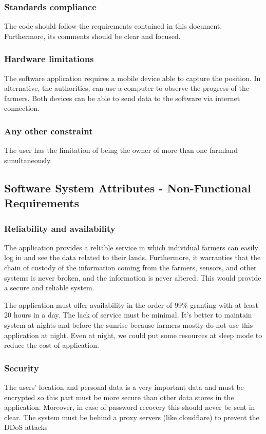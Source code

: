     \subsubsection{Standards compliance}
    The code should follow the requirements contained in this document. Furthermore, its comments should be clear and focused.
    \subsubsection{Hardware limitations}
    The software application requires a mobile device able to capture the position. In alternative, the authorities, can use a computer to observe the progress of the farmers. Both devices can be able to send data to the software via internet connection.
    \subsubsection{Any other constraint}
    The user has the limitation of being the owner of more than one farmland simultaneously.
\subsection{Software System Attributes - Non-Functional Requirements}
    \subsubsection{Reliability and availability}
    The application provides a reliable service in which individual farmers can easily log in and see the data related to their lands. Furthermore, it warranties that the chain of custody of the information coming from the farmers, sensors, and other systems is never broken, and the information is never altered. This would provide a secure and reliable system.
    
    The application must offer availability in the order of 99\% granting with at least 20 hours in a day. The lack of service must be minimal. It’s better to maintain system at nights and before the sunrise because farmers mostly do not use this application at night. Even at night, we could put some resources at sleep mode to reduce the cost of application.
    
    \subsubsection{Security}
    The users’ location and personal data is a very important data and must be encrypted so this part must be more secure than other data stores in the application. Moreover, in case of password recovery this should never be sent in clear. The system must be behind a proxy servers (like cloudflare) to prevent the DDoS attacks
